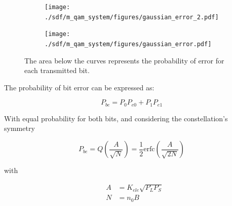 \begin{refsection}
\begin{figure}[H]
	\centering
	\begin{subfigure}{.5\textwidth}
		\centering
		\texttt{[image: ./sdf/m\_qam\_system/figures/gaussian\_error\_2.pdf]}
	\end{subfigure}%
	\begin{subfigure}{.5\textwidth}
		\centering
		\texttt{[image: ./sdf/m\_qam\_system/figures/gaussian\_error.pdf]}
	\end{subfigure}
	\caption{The area below the curves represents the probability of error for each transmitted bit.}
	\label{fig:gausserr}
\end{figure}

The probability of bit error can be expressed as:

\begin{equation}
P_{be} = P_0 P_{e0} + P_1 P_{e1}
\end{equation}

With equal probability for both bits, and considering the constellation's symmetry

\begin{equation}\label{eq:berMQAM}
P_{be} =  Q\left({\frac{A}{\sqrt{N}}}\right) = \frac{1}{2} \text{erfc}\left({\frac{A}{\sqrt{2 N}}}\right) 
\end{equation}





with


\begin{eqnarray}
&A &= K_{ele} \sqrt{P_L P_S}\label{eq:bpskamplitude}\\
&N & = n_0 B\label{eq:noiseBw}
\end{eqnarray}


\end{refsection}
